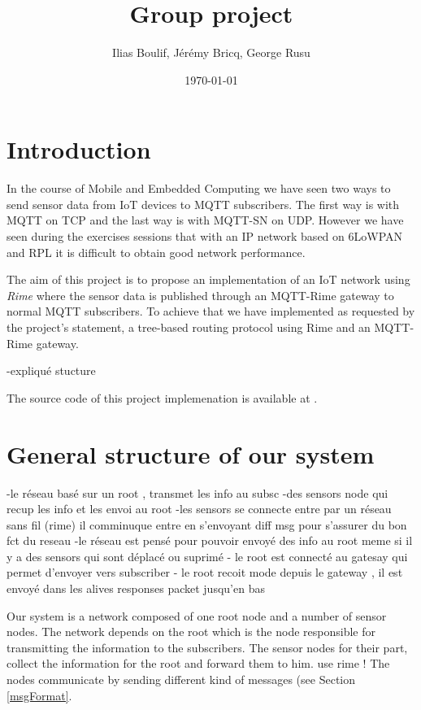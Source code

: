 \documentclass[a4paper,10pt]{article}
\title{Group project}
\author{Ilias Boulif, Jérémy Bricq, George Rusu}
\date{\today}
\begin{document}
\maketitle
\tableofcontents
\newpage
\section{Introduction}

In the course of Mobile and Embedded Computing we have seen two ways to send sensor data from IoT devices to MQTT subscribers. The first way is with MQTT on TCP and the last way is with MQTT-SN on UDP. However we have seen during the exercises sessions that with an IP network based on 6LoWPAN and RPL it is difficult to obtain good network performance.

The aim of this project is to propose an implementation of an IoT network using \textit{Rime} where the sensor data is published through an MQTT-Rime gateway to normal MQTT subscribers. To achieve that we have implemented as requested by the project's statement, a tree-based routing protocol using Rime and an MQTT-Rime gateway.

-expliqué stucture

The source code of this project implemenation is available at \cite{github}.


\section{General structure of our system}
-le réseau basé sur un root , transmet les info au subsc
-des sensors node qui recup les info et les envoi au root
-les sensors se connecte entre par un réseau sans fil (rime)
il comminuque entre en s'envoyant diff msg pour s'assurer du bon fct du reseau
-le réseau est pensé pour pouvoir envoyé des info au root meme si il y a des sensors qui sont déplacé ou suprimé
- le root est connecté au gatesay qui permet d'envoyer vers subscriber
- le root recoit mode depuis le gateway , il est envoyé dans les alives responses packet jusqu'en bas

Our system is a network composed of one root node and a number of sensor nodes. The network depends on the root which is the node responsible for transmitting the information to the subscribers. The sensor nodes for their part, collect the information for the root and forward them to him.  use rime ! The nodes communicate by sending different kind of messages (see Section \ref{msgFormat}.
\end{document}
